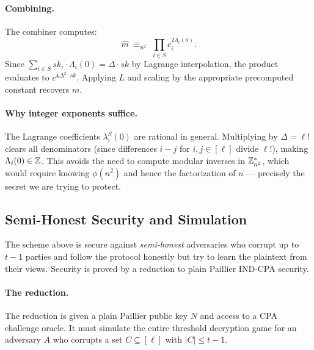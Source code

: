 \paragraph{Combining.}
The combiner computes:
\[
  \hat{m} \;\equiv_{n^2}\; \prod_{i \in S} c_i^{2\Lambda_i(0)}.
\]
Since $\sum_{i \in S} sk_i \cdot \Lambda_i(0) = \Delta \cdot sk$ by Lagrange interpolation,
the product evaluates to $c^{4\Delta^2 \cdot sk}$. Applying $L$ and scaling by the
appropriate precomputed constant recovers $m$.

\paragraph{Why integer exponents suffice.}
The Lagrange coefficients $\lambda_i^S(0)$ are rational in general. Multiplying by
$\Delta = \ell!$ clears all denominators (since differences $i - j$ for $i,j \in [\ell]$
divide $\ell!$), making $\Lambda_i(0) \in \mathbb{Z}$. This avoids the need to compute modular
inverses in $\mathbb{Z}_{n^2}^*$, which would require knowing $\phi(n^2)$ and hence the
factorization of $n$ --- precisely the secret we are trying to protect.

\subsection{Semi-Honest Security and Simulation}

The scheme above is secure against \emph{semi-honest} adversaries who corrupt up to $t-1$
parties and follow the protocol honestly but try to learn the plaintext from their views.
Security is proved by a reduction to plain Paillier IND-CPA security.

\paragraph{The reduction.}
The reduction is given a plain Paillier public key $N$ and access to a CPA challenge oracle.
It must simulate the entire threshold decryption game for an adversary $A$ who corrupts a
set $C \subseteq [\ell]$ with $|C| \leq t-1$.

